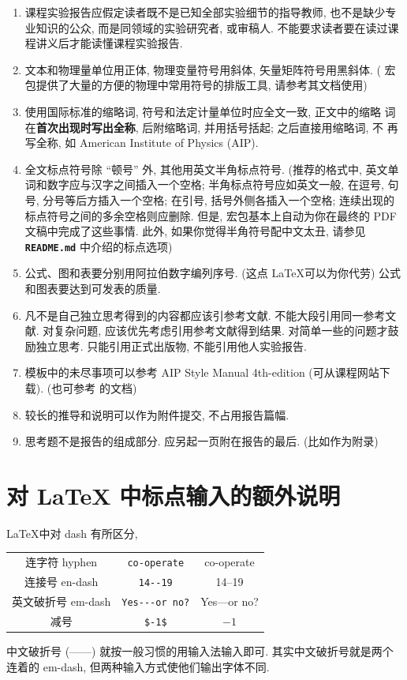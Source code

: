 \documentclass[font=fandol]{mpltx}
\newcommand{\note}[1]{{\color{gray}#1}}
\newcommand*\file[1]{\textbf{\texttt{#1}}}
\begin{document}
\begin{enumerate}
	\item 课程实验报告应假定读者既不是已知全部实验细节的指导教师, 也不是缺少专业知识的公众, 而是同领域的实验研究者, 或审稿人.
	      不能要求读者要在读过课程讲义后才能读懂课程实验报告.
	\item 文本和物理量单位用正体, 物理变量符号用斜体, 矢量矩阵符号用黑斜体.
	      \note{( 宏包提供了大量的方便的物理中常用符号的排版工具, 请参考其文档使用)}
	\item 使用国际标准的缩略词, 符号和法定计量单位时应全文一致, 正文中的缩略
	      词在\textbf{首次出现时写出全称}, 后附缩略词, 并用括号括起; 之后直接用缩略词, 不
	      再写全称, 如 American Institute of Physics (AIP).
	\item 全文标点符号除 ``顿号'' 外, 其他用英文半角标点符号.
	      \note{(推荐的格式中, 英文单词和数字应与汉字之间插入一个空格;
		      半角标点符号应如英文一般, 在逗号, 句号, 分号等后方插入一个空格;
		      在引号, 括号外侧各插入一个空格;
		      连续出现的标点符号之间的多余空格则应删除.
		      但是, \pkg{xeCJK} 宏包基本上自动为你在最终的 PDF 文稿中完成了这些事情.
		      此外, 如果你觉得半角符号配中文太丑, 请参见 \file{README.md} 中介绍的标点选项)}
	\item 公式、图和表要分别用阿拉伯数字编列序号. \note{(这点 \LaTeX 可以为你代劳)}
	      公式和图表要达到可发表的质量.
	\item 凡不是自己独立思考得到的内容都应该引参考文献.
	      不能大段引用同一参考文献.
	      对复杂问题, 应该优先考虑引用参考文献得到结果.
	      对简单一些的问题才鼓励独立思考.
	      只能引用正式出版物, 不能引用他人实验报告.
	\item 模板中的未尽事项可以参考 AIP Style Manual 4th-edition (可从课程网站下载).
	      \note{(也可参考  的文档)}
	\item 较长的推导和说明可以作为附件提交, 不占用报告篇幅.
	\item 思考题不是报告的组成部分.
	      应另起一页附在报告的最后. \note{(比如作为附录)}
\end{enumerate}

\section{对 \LaTeX{} 中标点输入的额外说明}
\LaTeX 中对 dash 有所区分,
\begin{center}
	\begin{tabular}{c@{\quad}c@{\ $\rightarrow$\ }c}
		连字符 hyphen      & \verb|co-operate|   & co-operate   \\
		连接号 en-dash     & \verb|14--19|       & 14--19       \\
		英文破折号 em-dash & \verb|Yes---or no?| & Yes---or no? \\
		减号               & \verb|$-1$|         & $-1$         \\
	\end{tabular}
\end{center}
中文破折号 (——) 就按一般习惯的用输入法输入即可.
\note{其实中文破折号就是两个连着的 em-dash, 但两种输入方式使他们输出字体不同.}
\end{document}
